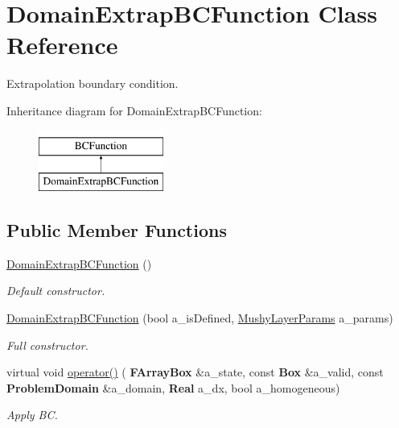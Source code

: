 \hypertarget{class_domain_extrap_b_c_function}{}\section{Domain\+Extrap\+B\+C\+Function Class Reference}
\label{class_domain_extrap_b_c_function}


Extrapolation boundary condition.  


Inheritance diagram for Domain\+Extrap\+B\+C\+Function\+:\begin{figure}[H]
\begin{center}
\leavevmode
\includegraphics[height=2.000000cm]{class_domain_extrap_b_c_function}
\end{center}
\end{figure}
\subsection*{Public Member Functions}
\begin{DoxyCompactItemize}
\item 
\mbox{\label{class_domain_extrap_b_c_function_a55a5528b06fed1fb88b785cf7d87fecc}} 
\hyperlink{class_domain_extrap_b_c_function_a55a5528b06fed1fb88b785cf7d87fecc}{Domain\+Extrap\+B\+C\+Function} ()
\begin{DoxyCompactList}\small\item\em Default constructor. \end{DoxyCompactList}\item 
\mbox{\label{class_domain_extrap_b_c_function_ad083a3d037a1a95e4f9dbcca09510379}} 
\hyperlink{class_domain_extrap_b_c_function_ad083a3d037a1a95e4f9dbcca09510379}{Domain\+Extrap\+B\+C\+Function} (bool a\+\_\+is\+Defined, \hyperlink{class_mushy_layer_params}{Mushy\+Layer\+Params} a\+\_\+params)
\begin{DoxyCompactList}\small\item\em Full constructor. \end{DoxyCompactList}\item 
\mbox{\label{class_domain_extrap_b_c_function_a0131a3747f9d742a4c802aa460805f5f}} 
virtual void \hyperlink{class_domain_extrap_b_c_function_a0131a3747f9d742a4c802aa460805f5f}{operator()} (\textbf{ F\+Array\+Box} \&a\+\_\+state, const \textbf{ Box} \&a\+\_\+valid, const \textbf{ Problem\+Domain} \&a\+\_\+domain, \textbf{ Real} a\+\_\+dx, bool a\+\_\+homogeneous)
\begin{DoxyCompactList}\small\item\em Apply BC. \end{DoxyCompactList}\end{DoxyCompactItemize}

